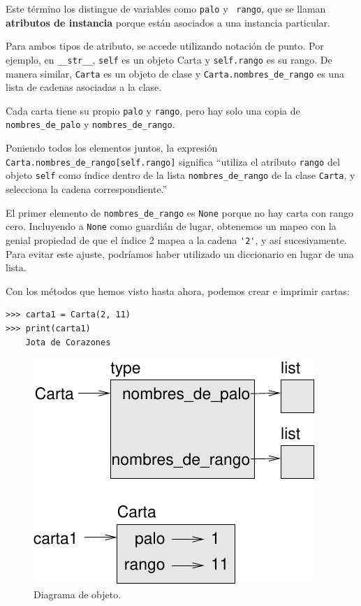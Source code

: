 \documentclass[10pt]{book}
\begin{document}
Este término los distingue de variables como {\tt palo} y {\tt
  rango}, que se llaman {\bf atributos de instancia} porque están
asociados a una instancia particular.

Para ambos tipos de atributo, se accede utilizando notación de punto.  Por
ejemplo, en \verb"__str__", {\tt self} es un objeto Carta
y {\tt self.rango} es su rango.  De manera similar, {\tt Carta}
es un objeto de clase y \verb"Carta.nombres_de_rango" es una
lista de cadenas asociadas a la clase.

Cada carta tiene su propio {\tt palo} y {\tt rango}, pero hay
solo una copia de \verb"nombres_de_palo" y \verb"nombres_de_rango".

Poniendo todos los elementos juntos, la expresión
\verb"Carta.nombres_de_rango[self.rango]" significa ``utiliza el atributo {\tt rango}
del objeto {\tt self} como índice dentro de la lista \verb"nombres_de_rango"
de la clase {\tt Carta}, y selecciona la cadena correspondiente.''

El primer elemento de \verb"nombres_de_rango" es {\tt None} porque no
hay carta con rango cero.  Incluyendo a {\tt None} como guardián de lugar,
obtenemos un mapeo con la genial propiedad de que el índice 2 mapea a la
cadena \verb"'2'", y así sucesivamente.  Para evitar este ajuste, podríamos haber
utilizado un diccionario en lugar de una lista.

Con los métodos que hemos visto hasta ahora, podemos crear e imprimir cartas:

\begin{verbatim}
>>> carta1 = Carta(2, 11)
>>> print(carta1)
    Jota de Corazones
\end{verbatim}

\begin{figure}
\centerline
{\includegraphics[scale=0.8]{figs/card1.pdf}}
\caption{Diagrama de objeto.}
\label{fig.card1}
\end{figure}
\end{document}
